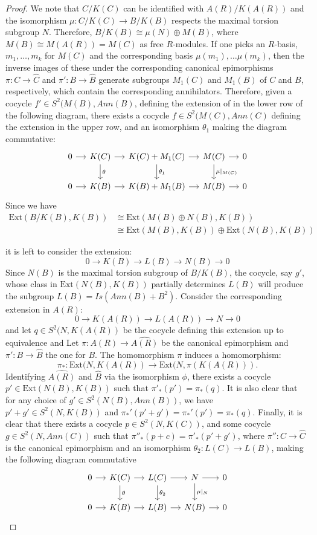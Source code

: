 \documentclass{article}
\theoremstyle{remark}
\def\Ext{\text{Ext}}
\begin{document}
\begin{proof}
We note that $C/K(C)$ can be identified with $A(R)/K(A(R))$ and the isomorphism $\mu:C/K(C) \to B/K(B)$ respects the maximal torsion subgroup $N$. Therefore, $B/K(B)\cong \mu(N) \oplus M(B)$, where $M(B)\cong M(A(R))=M(C)$ as free $R$-modules. If one picks an $R$-basis, $m_1, \ldots ,m_k$ for $M(C)$ and the corresponding basis $\mu(m_1), \ldots \mu(m_k)$, then the inverse images of these under the corresponding canonical epimorphisms $\pi:C\to\widehat{C}$ and $\pi':B\to \widehat{B}$ generate subgroups $M_1(C)$ and $M_1(B)$ of $C$ and $B$, respectively, which contain the corresponding annihilators. Therefore, given a cocycle $f'\in S^2(M(B), Ann(B)$, defining the extension of in the lower row of the following diagram, there exists a cocycle $f\in S^2(M(C), Ann(C)$ defining the extension in the upper row, and an isomorphism $\theta_1$ making the diagram commutative:
$$\begin{tikzcd}[column sep=small]
0 \arrow[r] & K(C) \arrow[r]  \arrow[d,"\theta"] &
K(C)+M_1(C) \arrow[r] \arrow[d, "\theta_1"]&
M(C) \arrow[r]\arrow[d,"\mu|_{M(C)}"] &0\\
0 \arrow[r] & K(B) \arrow[r] &
K(B)+M_1(B) \arrow[r]  &
M(B) \arrow[r]  & 0
\end{tikzcd}$$
Since we have 
\begin{equation}\label{eqn:exts}
\begin{split}
\Ext(B/K(B),K(B))&\cong \Ext(M(B)\oplus N(B), K(B))\\
&\cong  \Ext(M(B), K(B))\oplus  \Ext(N(B), K(B))
\end{split}
\end{equation}

it is left to consider the extension:
$$0\to K(B)\to L(B) \to N(B)\to 0$$
Since $N(B)$ is the maximal torsion subgroup of $B/K(B)$, the cocycle, say $g'$, whose class in $\Ext (N(B), K(B))$ partially determines $L(B)$ will produce the subgroup $L(B)=Is(Ann(B) + B^2)$. Consider the corresponding extension in $A(R)$:
$$0\to K(A(R))\to L(A(R)) \to N\to 0$$
and let $q\in S^2(N, K(A(R))$ be the cocycle defining this extension up to equivalence and
Let $\pi:A(R) \to \widehat{A(R)}$ be the canonical epimorphism and $\pi': B \to \widehat{B}$ the one for $B$. The homomorphism $\pi$ induces a homomorphism: $$\pi_*: \Ext(N, K(A(R)) \to \Ext(N, \pi(K(A(R))).$$ Identifying $\widehat{A(R)}$ and $\widehat{B}$ via the isomorphism $\phi$, there exists a cocycle $p'\in \Ext(N(B), K(B))$ such that $\pi'_*(p')=\pi_*(q)$. It is also clear that for any choice of $g'\in S^2(N(B), Ann(B))$, we have $p'+g' \in S^2(N, K(B))$ and $\pi_*'(p'+g')=\pi_*'(p')=\pi_*(q)$. Finally, it is clear that there exists a cocycle $p\in S^2(N, K(C))$, and some cocycle $g\in S^2(N, Ann(C))$ such that $\pi''_*(p+c)=\pi'_*(p'+g')$, where $\pi'':C\to \widehat{C}$ is the canonical epimorphism and an isomorphism $\theta_2: L(C) \to L(B)$, making the following diagram commutative
$$\begin{tikzcd}[column sep=small]
0 \arrow[r] & K(C) \arrow[r]  \arrow[d,"\theta"] &
L(C) \arrow[r] \arrow[d, "\theta_2"]&
N \arrow[r]\arrow[d,"\mu|_{N}"] &0\\
0 \arrow[r] & K(B) \arrow[r] &
L(B) \arrow[r]  &
N(B) \arrow[r]  & 0
\end{tikzcd}$$


\end{proof}
\end{document}
